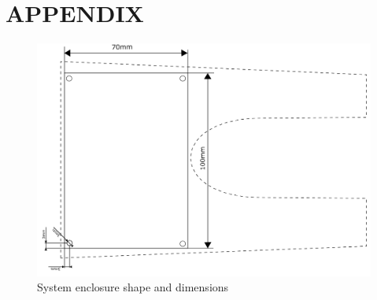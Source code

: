 \section{APPENDIX}\label{sec:app}

\begin{figure}[htb]
	\centering
    \includegraphics[width=\linewidth]{Figures/casing_dimensions.png}
	\caption{System enclosure shape and dimensions}
	\label{fig:casdim}
\end{figure}

